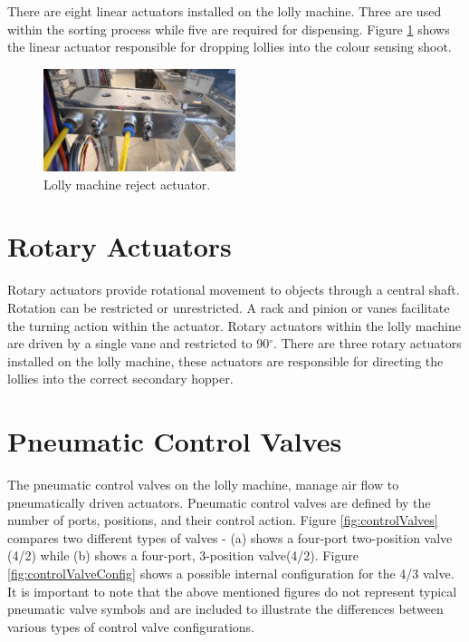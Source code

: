     There are eight linear actuators installed on the lolly machine. Three are used within the sorting process while five are required for dispensing. Figure \ref{fig:rejectAct} shows the linear actuator responsible for dropping lollies into the colour sensing shoot.

    \begin{figure}[H] 
        \centering
        \includegraphics[width = 0.5\textwidth]{2_images/rejectAct.png}
        \caption{Lolly machine reject actuator.}
        \label{fig:rejectAct}
    \end{figure}        
    
\section{Rotary Actuators}
    Rotary actuators provide rotational movement to objects through a central shaft\cite{parr2011hydraulics}. Rotation can be restricted or unrestricted. A rack and pinion or vanes facilitate the turning action within the actuator\cite{parr2011hydraulics}. Rotary actuators within the lolly machine are driven by a single vane and restricted to 90$^{\circ}$\cite{smcRot}. There are three rotary actuators installed on the lolly machine, these actuators are responsible for directing the lollies into the correct secondary hopper.

\section{Pneumatic Control Valves}
    The pneumatic control valves on the lolly machine, manage air flow to pneumatically driven actuators. Pneumatic control valves are defined by the number of ports, positions, and their control action\cite{parr2011hydraulics}. Figure \ref{fig:controlValves} compares two different types of valves - (a) shows a four-port two-position valve (4/2) while (b) shows a four-port, 3-position valve(4/2). Figure \ref{fig:controlValveConfig} shows a possible internal configuration for the 4/3 valve. It is important to note that the above mentioned figures do not represent typical pneumatic valve symbols and are included to illustrate the differences between various types of control valve configurations.
    
